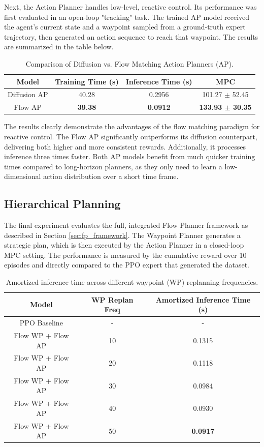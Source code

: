Next, the Action Planner handles low-level, reactive control. Its performance was first evaluated in an open-loop "tracking" task. The trained AP model received the agent's current state and a waypoint sampled from a ground-truth expert trajectory, then generated an action sequence to reach that waypoint. The results are summarized in the table below.

\begin{table}[H]
\centering
\caption{Comparison of Diffusion vs. Flow Matching Action Planners (AP).}
\label{tab:ap_results}
\begin{tabular}{|c|c|c|c|}
\hline
\textbf{Model} & \textbf{Training Time (s)} & \textbf{Inference Time (s)} & \textbf{MPC} \\
\hline
Diffusion AP & 40.28 & 0.2956 & 101.27 $\pm$ 52.45 \\
\hline
Flow AP & \textbf{39.38} & \textbf{0.0912} & \textbf{133.93 $\pm$ 30.35} \\
\hline
\end{tabular}
\end{table}

The results clearly demonstrate the advantages of the flow matching paradigm for reactive control. The Flow AP significantly outperforms its diffusion counterpart, delivering both higher and more consistent rewards. Additionally, it processes inference three times faster. Both AP models benefit from much quicker training times compared to long-horizon planners, as they only need to learn a low-dimensional action distribution over a short time frame.

\subsection{Hierarchical Planning}
The final experiment evaluates the full, integrated Flow Planner framework as described in Section \ref{sec:fp_framework}. The Waypoint Planner generates a strategic plan, which is then executed by the Action Planner in a closed-loop MPC setting. The performance is measured by the cumulative reward over 10 episodes and directly compared to the PPO expert that generated the dataset.

\begin{table}[H]
\centering
\caption{Amortized inference time across different waypoint (WP) replanning frequencies.}
\label{tab:wp_inference}
\begin{tabular}{|c|c|c|}
\hline
\textbf{Model} & \textbf{WP Replan Freq} & \textbf{Amortized Inference Time (s)} \\
\hline
PPO Baseline & - & - \\
\hline
Flow WP + Flow AP & 10 & 0.1315 \\
\hline
Flow WP + Flow AP & 20 & 0.1118 \\
\hline
Flow WP + Flow AP & 30 & 0.0984 \\
\hline
Flow WP + Flow AP & 40 & 0.0930 \\
\hline
Flow WP + Flow AP & 50 & \textbf{0.0917} \\
\hline
\end{tabular}
\end{table}

